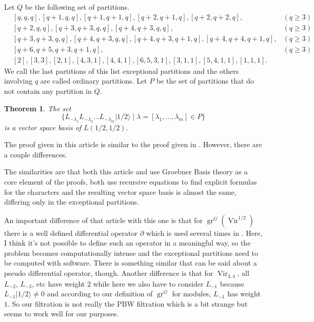\documentclass[12pt,a4paper]{article}
\newtheorem{theorem}{Theorem}
\DeclareMathOperator{\Vir}{Vir}
\DeclareMathOperator{\gr}{gr}
\newcommand{\vachalf}{|1/2\rangle}
\begin{document}
Let $Q$ be the following set of partitions.
\begin{align*}
  &[q,q,q],[q+1,q,q],[q+1,q+1,q],[q+2,q+1,q],[q+2,q+2,q], &(q\ge 3) \\
  &[q+2,q,q], [q+3,q+3,q,q], [q+4,q+3,q,q], &(q\ge 3) \\
  &[q+3,q+3,q,q], [q+4,q+3,q,q], [q+4,q+3,q+1,q], [q+4,q+4,q+1,q], &(q\ge 3) \\
  &[q+6,q+5,q+3,q+1,q], &(q\ge 3) \\
  &[2],[3,3],[2,1],[4,3,1],[4,4,1],[6,5,3,1],[3,1,1],[5,4,1,1],[1,1,1].
\end{align*}
We call the last partitions of this list exceptional partitions and the others involving $q$ are called ordinary partitions.
Let $P$ be the set of partitions that do not contain any partition in $Q$.
\begin{theorem}
  \label{thr:4}
  The set
  \begin{equation*}
    \{L_{-\lambda_1}L_{-\lambda_2}\dots L_{-\lambda_m}\vachalf\mid \lambda=[\lambda_1,\dots,\lambda_m] \in P\}
  \end{equation*}
  is a vector space basis of $L(1/2,1/2)$.
\end{theorem}

The proof given in this article is similar to the proof given in \cite{andrews_singular_2022}.
However, there are a couple differences.

The similarities are that both this article and \cite{andrews_singular_2022} use Groebner Basis theory as a core element of the proofs, both use recursive equations to find explicit formulas for the characters and the resulting vector space basis is almost the same, differing only in the exceptional partitions.

An important difference of that article with this one is that for $\gr^G(\Vir^{1/2})$ there is a well defined differential operator $\partial$ which is used several times in \cite{andrews_singular_2022}.
Here, I think it's not possible to define such an operator in a meaningful way, so the problem becomes computationally intense and the exceptional partitions need to be computed with software.
There is something similar that can be said about a pseudo differential operator, though.
Another difference is that for $\Vir_{3,4}$, all $L_{-2}$, $L_{-3}$, etc have weight $2$ while here we also have to consider $L_{-1}$ because $L_{-1}\vachalf\neq 0$ and according to our definition of $\gr^G$ for modules, $L_{-1}$ has weight $1$.
So our filtration is not really the PBW filtration which is a bit strange but seems to work well for our purposes.
\end{document}
